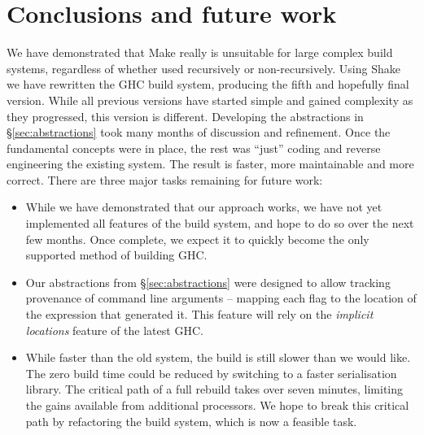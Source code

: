 \section{Conclusions and future work\label{section-conclusions}}

We have demonstrated that Make really is unsuitable for large complex build
systems, regardless of whether used recursively or non-recursively. Using Shake
we have rewritten the GHC build system, producing the fifth and hopefully final
version. While all previous versions have started simple and gained complexity
as they progressed, this version is different. Developing the abstractions in
\S\ref{sec:abstractions} took many months of discussion and refinement. Once the
fundamental concepts were in place, the rest was ``just'' coding and reverse
engineering the existing system. The result is faster, more maintainable and
more correct. There are three major tasks remaining for future work:

\begin{itemize}
\item While we have demonstrated that our approach works, we have not yet
implemented all features of the build system, and hope to do so over the next
few months. Once complete, we expect it to quickly become the only supported
method of building GHC.

\item Our abstractions from \S\ref{sec:abstractions} were designed to allow
tracking provenance of command line arguments -- mapping each flag to the
location of the expression that generated it. This feature will rely on the
\emph{implicit locations} feature of the latest GHC.


\item While faster than the old system, the build is still slower than we would
like. The zero build time could be reduced by switching to a faster serialisation
library. The critical path of a full rebuild takes over seven minutes, limiting
the gains available from additional processors. We hope to break this critical path
by refactoring the build system, which is now a feasible task.
\end{itemize}
